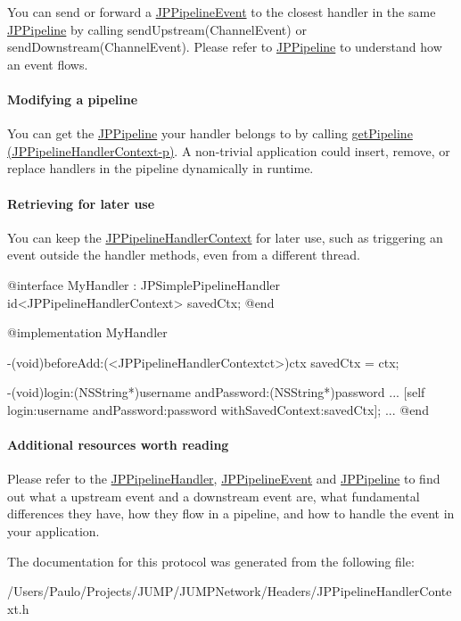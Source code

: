 You can send or forward a \hyperlink{a00023}{JPPipelineEvent} to the closest handler in the same \hyperlink{a00019}{JPPipeline} by calling sendUpstream(ChannelEvent) or sendDownstream(ChannelEvent). Please refer to \hyperlink{a00019}{JPPipeline} to understand how an event flows.

\paragraph*{Modifying a pipeline}

You can get the \hyperlink{a00019}{JPPipeline} your handler belongs to by calling \hyperlink{a00030_a19bb45818df9ae3674732158f8d1cfd9}{getPipeline (JPPipelineHandlerContext-\/p)}. A non-\/trivial application could insert, remove, or replace handlers in the pipeline dynamically in runtime.

\paragraph*{Retrieving for later use}

You can keep the \hyperlink{a00030}{JPPipelineHandlerContext} for later use, such as triggering an event outside the handler methods, even from a different thread.


\begin{DoxyCode}
 @interface MyHandler : JPSimplePipelineHandler {
        id<JPPipelineHandlerContext> savedCtx;
 }
 @end
 
 @implementation MyHandler
 
 -(void)beforeAdd:(<JPPipelineHandlerContextct>)ctx {
        savedCtx = ctx;
 }
 
 -(void)login:(NSString*)username andPassword:(NSString*)password {
        ... 
        [self login:username andPassword:password withSavedContext:savedCtx]; 
        ...
 }
 @end
\end{DoxyCode}


\paragraph*{Additional resources worth reading}

Please refer to the \hyperlink{a00029}{JPPipelineHandler}, \hyperlink{a00023}{JPPipelineEvent} and \hyperlink{a00019}{JPPipeline} to find out what a upstream event and a downstream event are, what fundamental differences they have, how they flow in a pipeline, and how to handle the event in your application. 

The documentation for this protocol was generated from the following file:\begin{DoxyCompactItemize}
\item 
/Users/Paulo/Projects/JUMP/JUMPNetwork/Headers/JPPipelineHandlerContext.h\end{DoxyCompactItemize}
